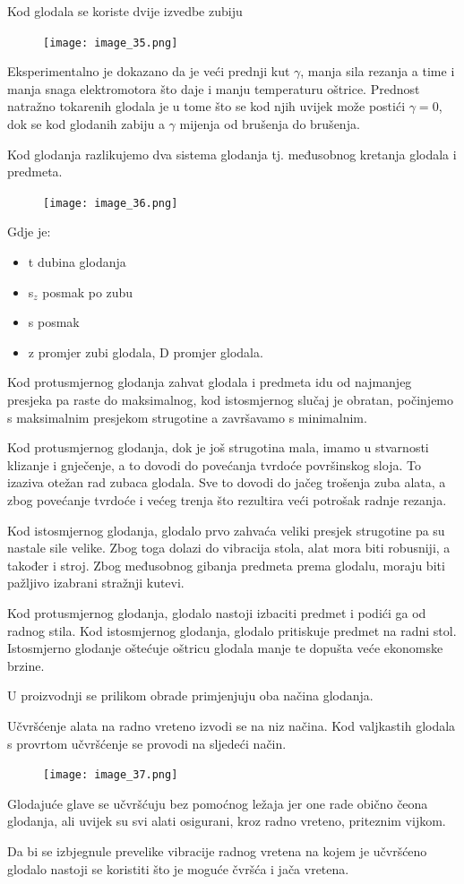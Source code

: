 \documentclass[a4paper,12pt]{article}
\numberwithin{figure}{section}
\begin{document}
\clearpage
Kod glodala se koriste dvije izvedbe zubiju
\begin{figure}[!h]
\centering
\texttt{[image: image\_35.png]}
\end{figure}
\FloatBarrier
Eksperimentalno je dokazano da je veći prednji kut $\gamma$, manja sila rezanja a time i manja snaga elektromotora što daje i manju temperaturu oštrice. Prednost natražno tokarenih glodala je u tome što se kod njih uvijek može postići $\gamma = 0$, dok se kod glodanih zabiju a $\gamma$ mijenja od brušenja do brušenja.\par
Kod glodanja razlikujemo dva sistema glodanja tj. međusobnog kretanja glodala i predmeta.
\begin{figure}[!h]
\centering
\texttt{[image: image\_36.png]}
\end{figure}
\FloatBarrier
Gdje je:
\begin{itemize}
\item t dubina glodanja
\item s$_{z}$ posmak po zubu
\item s posmak
\item z promjer zubi glodala, D promjer glodala.
\end{itemize}
Kod protusmjernog glodanja zahvat glodala i predmeta idu od najmanjeg presjeka pa raste do maksimalnog, kod istosmjernog slučaj je obratan, počinjemo s maksimalnim presjekom strugotine a završavamo s minimalnim.\par
Kod  protusmjernog glodanja, dok je još strugotina mala, imamo u stvarnosti klizanje i gnječenje, a to dovodi do povećanja tvrdoće površinskog sloja. To izaziva otežan rad zubaca glodala. Sve to dovodi do jačeg trošenja zuba alata, a zbog povećanje tvrdoće i većeg trenja što rezultira veći potrošak radnje rezanja.\par
Kod istosmjernog glodanja, glodalo prvo zahvaća veliki presjek strugotine pa su nastale sile velike. Zbog toga
dolazi do vibracija stola, alat mora biti robusniji, a također i stroj. Zbog međusobnog gibanja predmeta prema glodalu, moraju biti pažljivo izabrani stražnji kutevi. \par
Kod protusmjernog glodanja, glodalo nastoji izbaciti predmet i podići ga od radnog stila. Kod istosmjernog glodanja, glodalo pritiskuje predmet na radni stol. Istosmjerno glodanje oštećuje oštricu glodala manje te dopušta veće ekonomske brzine.\par
U proizvodnji se prilikom obrade primjenjuju oba načina glodanja.\par
Učvršćenje alata na radno vreteno izvodi se na niz načina. Kod valjkastih glodala s provrtom učvršćenje se provodi na sljedeći način.
\begin{figure}[!h]
\centering
\texttt{[image: image\_37.png]}
\end{figure}
\FloatBarrier
Glodajuće glave se učvršćuju bez pomoćnog ležaja jer one rade obično čeona glodanja, ali uvijek su svi alati osigurani, kroz radno vreteno, priteznim vijkom.\par
Da bi se izbjegnule prevelike vibracije radnog vretena na kojem je učvršćeno glodalo nastoji se koristiti što je moguće čvršća i jača vretena.
\end{document}
